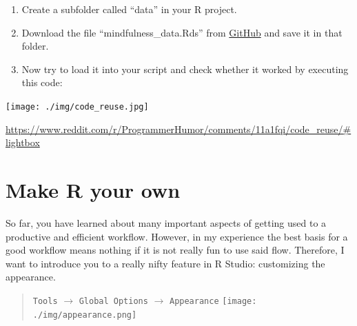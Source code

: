 \documentclass[
]{book}
\newenvironment{Shaded}{\begin{snugshade}}{\end{snugshade}}
\newcommand{\CommentTok}[1]{\textcolor[rgb]{0.56,0.35,0.01}{\textit{#1}}}
\newcommand{\FunctionTok}[1]{\textcolor[rgb]{0.13,0.29,0.53}{\textbf{#1}}}
\newcommand{\NormalTok}[1]{#1}
\newcommand{\OtherTok}[1]{\textcolor[rgb]{0.56,0.35,0.01}{#1}}
\newcommand{\StringTok}[1]{\textcolor[rgb]{0.31,0.60,0.02}{#1}}
\providecommand{\tightlist}{%
  \setlength{\itemsep}{0pt}\setlength{\parskip}{0pt}}
\begin{document}
\begin{enumerate}
\def\labelenumi{\arabic{enumi}.}
\tightlist
\item
  Create a subfolder called ``data'' in your R project.
\item
  Download the file ``mindfulness\_data.Rds'' from \href{https://github.com/the-tave/psych_research_in_r/blob/main/data/mindfulness_data.Rds}{GitHub} and save it in that folder.
\item
  Now try to load it into your script and check whether it worked by executing this code:
\end{enumerate}

\begin{Shaded}
\end{Shaded}

\texttt{[image: ./img/code\_reuse.jpg]}

\url{https://www.reddit.com/r/ProgrammerHumor/comments/11a1fqi/code_reuse/\#lightbox}

\section{Make R your own}\label{make-r-your-own}

So far, you have learned about many important aspects of getting used to a productive and efficient workflow.
However, in my experience the best basis for a good workflow means nothing if it is not really fun to use said flow.
Therefore, I want to introduce you to a really nifty feature in R Studio: customizing the appearance.

\begin{quote}
\texttt{Tools} \(\rightarrow\) \texttt{Global\ Options} \(\rightarrow\) \texttt{Appearance} \texttt{[image: ./img/appearance.png]}
\end{quote}
\end{document}
